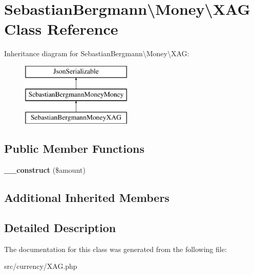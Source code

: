 \hypertarget{classSebastianBergmann_1_1Money_1_1XAG}{}\section{Sebastian\+Bergmann\textbackslash{}Money\textbackslash{}X\+A\+G Class Reference}
\label{classSebastianBergmann_1_1Money_1_1XAG}
Inheritance diagram for Sebastian\+Bergmann\textbackslash{}Money\textbackslash{}X\+A\+G\+:\begin{figure}[H]
\begin{center}
\leavevmode
\includegraphics[height=3.000000cm]{classSebastianBergmann_1_1Money_1_1XAG}
\end{center}
\end{figure}
\subsection*{Public Member Functions}
\begin{DoxyCompactItemize}
\item 
\hypertarget{classSebastianBergmann_1_1Money_1_1XAG_acc30af85a97a210bfca54be243cc3612}{}{\bfseries \+\_\+\+\_\+construct} (\$amount)\label{classSebastianBergmann_1_1Money_1_1XAG_acc30af85a97a210bfca54be243cc3612}

\end{DoxyCompactItemize}
\subsection*{Additional Inherited Members}


\subsection{Detailed Description}


The documentation for this class was generated from the following file\+:\begin{DoxyCompactItemize}
\item 
src/currency/X\+A\+G.\+php\end{DoxyCompactItemize}
